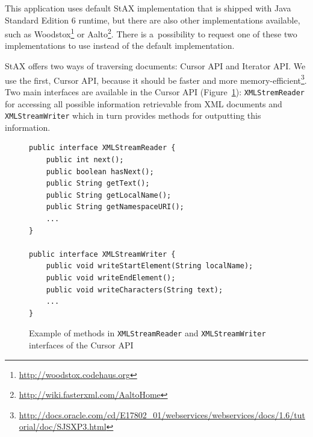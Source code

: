 \documentclass[11pt,oneside,final]{fithesis2}
\def\s#1{#1\index{#1}}
\begin{document}
This application uses default StAX implementation that is shipped with Java Standard Edition 6 runtime, but there are also other implementations available, such as \s{Woodstox}\footnote{\url{http://woodstox.codehaus.org}} or \s{Aalto}\footnote{\url{http://wiki.fasterxml.com/AaltoHome}}. There is a~possibility to request one of these two implementations to use instead of the default implementation.

StAX offers two ways of traversing documents: Cursor API and Iterator API. We use the first, Cursor API, because it should be faster and more memory-efficient\footnote{\url{http://docs.oracle.com/cd/E17802_01/webservices/webservices/docs/1.6/tutorial/doc/SJSXP3.html}}. Two main interfaces are available in the Cursor API (Figure~\ref{fig:staxcursorapi}): \texttt{XMLStremReader} for accessing all possible information retrievable from XML documents and \texttt{XMLStreamWriter} which in turn provides methods for outputting this information. 

\begin{figure}[!ht]
\begin{lstlisting}
public interface XMLStreamReader {
	public int next();
   	public boolean hasNext();
   	public String getText();		
  	public String getLocalName();
  	public String getNamespaceURI();
  	...
} 

public interface XMLStreamWriter {
  	public void writeStartElement(String localName);
  	public void writeEndElement();
 	public void writeCharacters(String text);
	... 
}
\end{lstlisting}
\caption{Example of methods in \texttt{XMLStreamReader} and \texttt{XMLStreamWriter} interfaces of the Cursor API}
\label{fig:staxcursorapi}
\end{figure}
\end{document}
